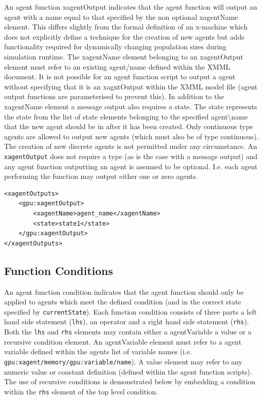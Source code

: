 \documentclass[11pt, a4paper, onecolumn, oneside]{report}
\begin{document}
An agent function xagentOutput indicates that the agent function will output an agent with a name equal to that specified by the non optional xagentName element.
This differs slightly from the formal definition of an x-machine which does not explicitly define a technique for the creation of new agents but adds functionality required for dynamically changing population sizes during simulation runtime.
The xagentName element belonging to an xagentOutput element must refer to an existing agent/name defined within the XMML document.
It is not possible for an agent function script to output a agent without specifying that it is an xagntOutput within the XMML model file (agent output functions are parameterised to prevent this).
In addition to the xagentName element a message output also requires a state.
The state represents the state from the list of state elements belonging to the specified agent\textbackslash{}name that the new agent should be in after it has been created.
Only continuous type agents are allowed to output new agents (which must also be of type continuous).
The creation of new discrete agents is not permitted under any circumstance.
An \texttt{xagentOutput} does not require a type (as is the case with a message output) and any agent function outputting an agent is assumed to be optional.
I.e. each agent performing the function may output either one or zero agents.

\begin{verbatim}
<xagentOutputs>
    <gpu:xagentOutput>
        <xagentName>agent_name</xagentName>
        <state>state1</state>
    </gpu:xagentOutput>
</xagentOutputs>
\end{verbatim}

\subsection{Function Conditions}
\label{sec:254}

An agent function condition indicates that the agent function should only be applied to agents which meet the defined condition (and in the correct state specified by \texttt{currentState}).
Each function condition consists of three parts a left hand side statement (\texttt{lhs}), an operator and a right hand side statement (\texttt{rhs}).
Both the \texttt{lhs} and \texttt{rhs} elements may contain either a agentVariable a value or a recursive condition element.
An agentVariable element must refer to a agent variable defined within the agents list of variable names (i.e.
\texttt{gpu:xagent/memory/gpu:variable/name}).
A value element may refer to any numeric value or constant definition (defined within the agent function scripts).
The use of recursive conditions is demonstrated below by embedding a condition within the \texttt{rhs} element of the top level condition.
\end{document}
